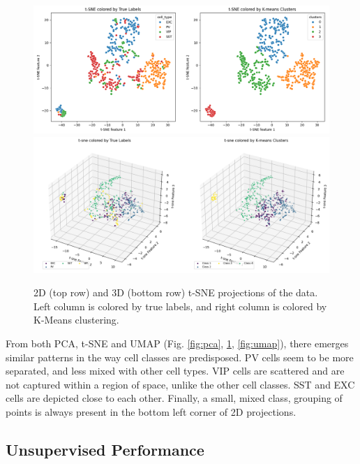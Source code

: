 \documentclass{IEEEtran}
\begin{document}
\begin{figure}[h!]
  \centering
  \includegraphics[width=1\columnwidth]{figures/Compare t-SNE 2D.png}
  \includegraphics[width=1\columnwidth]{figures/Compare t-SNE 3D.png}
  \caption{2D (top row) and 3D (bottom row) t-SNE projections of the data. Left column is colored by true labels, and right column is colored by K-Means clustering.}%
  \label{fig:t-SNE}
\end{figure}

From both PCA, t-SNE and UMAP (Fig. \ref{fig:pca}, \ref{fig:t-SNE}, \ref{fig:umap}), there emerges similar patterns in the way cell classes are predisposed. PV cells seem to be more separated, and less mixed with other cell types. VIP cells are scattered and are not captured within a region of space, unlike the other cell classes.
SST and EXC cells are depicted close to each other.
Finally, a small, mixed class, grouping of points is always present in the bottom left corner of 2D projections.

\subsection{Unsupervised Performance}
\end{document}
